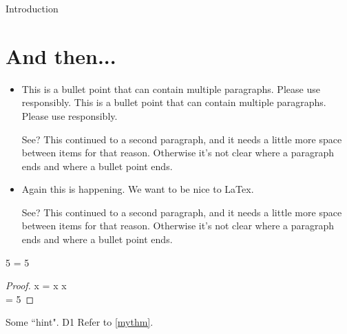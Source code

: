 \begin{MainChapter}{Introduction}
\newpage
\section{And then...}

\begin{itemize}[multipar]
    \item
    This is a bullet point that can contain multiple paragraphs. Please use responsibly.
    This is a bullet point that can contain multiple paragraphs. Please use responsibly.
    
    See? This continued to a second paragraph, and it needs a little more space between items for that reason. Otherwise it's not clear where a paragraph ends and where a bullet point ends.
    
    \item Again this is happening. We want to be nice to LaTex.
    
    See? This continued to a second paragraph, and it needs a little more space between items for that reason. Otherwise it's not clear where a paragraph ends and where a bullet point ends.
\end{itemize}

\begin{Theorem}[label=mythm, name=Fiveness]
5 = 5
\end{Theorem}

\begin{proof}
x = x \forall x\\
 = 5
\end{proof}

\begin{Hint}[name = An optional title., label=fives]
Some ``hint". \ac{D1}
Refer to \cref{mythm}.
\end{Hint}





\end{MainChapter}
